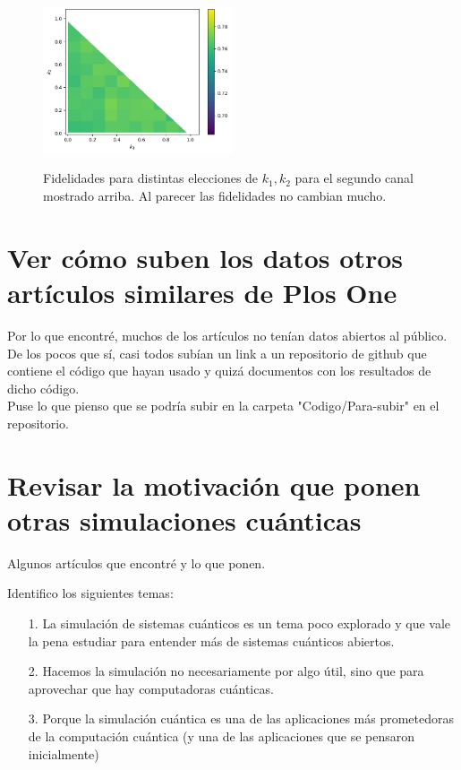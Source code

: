 \documentclass[10pt,letterpaper]{article} %
\begin{document}
\begin{figure}[h!]
\begin{center}
\includegraphics[width=0.5\textwidth]{images/2qbit.png}\\
\caption{Fidelidades para distintas elecciones de $k_1, k_2$ para el segundo canal mostrado arriba.  Al parecer las fidelidades no cambian mucho. }
\end{center}
\end{figure}

\newpage
\section{Ver cómo suben los datos otros artículos similares de Plos One}

Por lo que encontré, muchos de los artículos no tenían datos abiertos al público.
De los pocos que sí, casi todos subían un link a un repositorio de github que  contiene el código que hayan usado y quizá documentos con los resultados de dicho código.\\

Puse lo que pienso que se podría subir en la carpeta "Codigo/Para-subir" en el repositorio. 



\newpage
\section{Revisar la motivación que ponen otras simulaciones cuánticas}

Algunos artículos que encontré y lo que ponen.

Identifico los siguientes temas:
\begin{itemize}
\item[1.] {\color{green} La simulación de sistemas cuánticos es un tema poco explorado y que vale la pena estudiar para entender más de sistemas cuánticos abiertos.}
\item[2.] {\color{blue}  Hacemos la simulación no necesariamente por algo útil, sino que para aprovechar que hay computadoras cuánticas.}
\item[3.] {\color{orange} Porque la simulación cuántica es una de las aplicaciones más prometedoras de la computación cuántica (y una de las aplicaciones que se pensaron inicialmente)}
\end{itemize}
\end{document}
